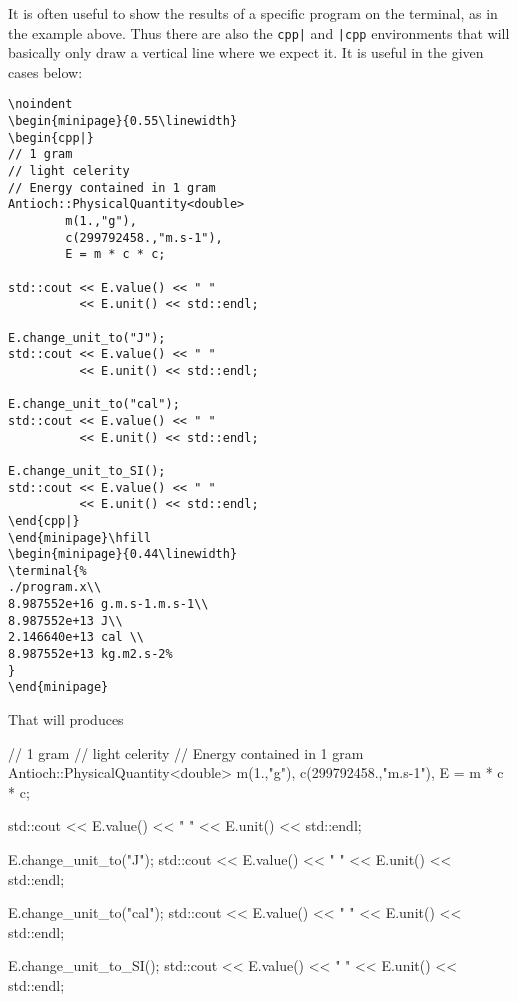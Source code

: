 \documentclass{documentation}
\begin{document}
It is often useful to show the results of a specific program
on the terminal, as in the example above. Thus there are
also the \verb!cpp|! and \verb!|cpp! environments that will
basically only draw a vertical line where we expect it. It
is useful in the given cases below:
\begin{verbatim}
\noindent
\begin{minipage}{0.55\linewidth}
\begin{cpp|} 
// 1 gram 
// light celerity
// Energy contained in 1 gram
Antioch::PhysicalQuantity<double> 
        m(1.,"g"),
        c(299792458.,"m.s-1"),
        E = m * c * c; 

std::cout << E.value() << " " 
          << E.unit() << std::endl;

E.change_unit_to("J");
std::cout << E.value() << " " 
          << E.unit() << std::endl;

E.change_unit_to("cal");
std::cout << E.value() << " " 
          << E.unit() << std::endl;

E.change_unit_to_SI();
std::cout << E.value() << " " 
          << E.unit() << std::endl;
\end{cpp|}
\end{minipage}\hfill
\begin{minipage}{0.44\linewidth}
\terminal{%
./program.x\\
8.987552e+16 g.m.s-1.m.s-1\\
8.987552e+13 J\\
2.146640e+13 cal \\
8.987552e+13 kg.m2.s-2%
}
\end{minipage}
\end{verbatim}
That will produces\\
\noindent
\begin{minipage}{0.55\linewidth}
\begin{cpp|} 
// 1 gram 
// light celerity
// Energy contained in 1 gram
Antioch::PhysicalQuantity<double> 
        m(1.,"g"),
        c(299792458.,"m.s-1"),
        E = m * c * c; 

std::cout << E.value() << " " 
          << E.unit() << std::endl;

E.change_unit_to("J");
std::cout << E.value() << " " 
          << E.unit() << std::endl;

E.change_unit_to("cal");
std::cout << E.value() << " " 
          << E.unit() << std::endl;

E.change_unit_to_SI();
std::cout << E.value() << " " 
          << E.unit() << std::endl;
\end{cpp|}
\end{minipage}\hfill
\end{document}
